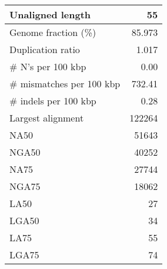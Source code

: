 \documentclass[12pt,a4paper]{article}
\begin{document}
\begin{table}[ht]
\begin{center}
\begin{tabular}{|l*{1}{|r}|}
Unaligned length & 55 \\ \hline
Genome fraction (\%) & 85.973 \\ \hline
Duplication ratio & 1.017 \\ \hline
\# N's per 100 kbp & 0.00 \\ \hline
\# mismatches per 100 kbp & 732.41 \\ \hline
\# indels per 100 kbp & 0.28 \\ \hline
Largest alignment & 122264 \\ \hline
NA50 & 51643 \\ \hline
NGA50 & 40252 \\ \hline
NA75 & 27744 \\ \hline
NGA75 & 18062 \\ \hline
LA50 & 27 \\ \hline
LGA50 & 34 \\ \hline
LA75 & 55 \\ \hline
LGA75 & 74 \\ \hline
\end{tabular}
\end{center}
\end{table}
\end{document}
